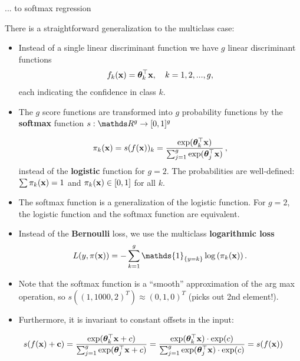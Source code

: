 \documentclass[11pt,compress,t,notes=noshow, xcolor=table]{beamer}
\begin{document}
\begin{vbframe}{... to softmax regression} 

There is a straightforward generalization to the multiclass case: 

\begin{itemize}
  \item Instead of a single linear discriminant function we have $g$ linear discriminant functions
    $$
      f_k(\mathbf{x}) = \bm{\theta}_k^\top \mathbf{x}, \quad k = 1, 2, ..., g,
    $$
  each indicating the confidence in class $k$.
  \item The $g$ score functions are transformed into $g$ probability functions by the \textbf{softmax} function $s:\R^g \to [0,1]^g$ 

  $$
    \pi_k(\mathbf{x}) = s(f(\mathbf{x}))_k = \frac{\exp(\bm{\theta}_k^\top \mathbf{x})}{\sum_{j = 1}^g \exp(\bm{\theta}_j^\top \mathbf{x}) }\,,
  $$
  instead of the \textbf{logistic} function for $g = 2$. The probabilities are well-defined: $\sum \pi_k(\mathbf{x}) = 1$ and $\pi_k(\mathbf{x}) \in [0, 1]$ for all $k$. 

  \item The softmax function is a generalization of the logistic function. For $g = 2$, the logistic function and the softmax function are equivalent. 

  \item Instead of the \textbf{Bernoulli} loss, we use the multiclass \textbf{logarithmic loss}
   $$
    L(y, \pix) = - \sum_{k = 1}^g \mathds{1}_{\{y = k\}} \log\left(\pi_k(\xv)\right).
  $$ 
    \item Note that the softmax function is a \enquote{smooth} approximation of the arg max operation,
        so $s((1, 1000, 2)^T) \approx (0, 1, 0)^T$ (picks out 2nd element!).  
    \item Furthermore, it is invariant to constant offsets in the input:  
      \end{itemize}
    $$ 
    s(f(\mathbf{x}) + \mathbf{c}) = \frac{\exp(\bm{\theta}_k^\top \mathbf{x} + c)}{\sum_{j = 1}^g \exp(\bm{\theta}_j^\top \mathbf{x} + c)} = 
    \frac{\exp(\bm{\theta}_k^\top \mathbf{x})\cdot \exp(c)}{\sum_{j = 1}^g \exp(\bm{\theta}_j^\top \mathbf{x}) \cdot \exp(c)} = 
    s(f(\mathbf{x}))
    $$  


\end{vbframe}
\end{document}
